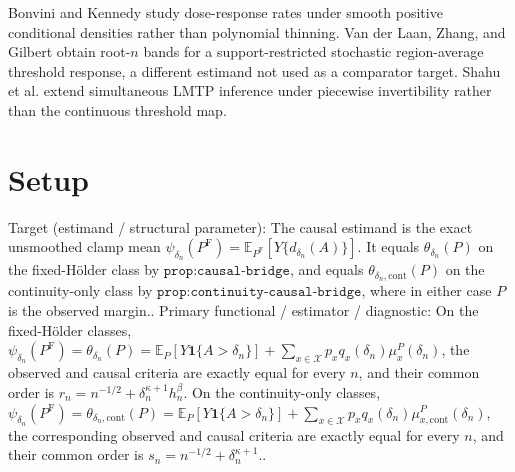 \documentclass{article}
\begin{document}
Bonvini and Kennedy study dose-response rates under smooth positive conditional densities rather than polynomial thinning. Van der Laan, Zhang, and Gilbert obtain root-\(n\) bands for a support-restricted stochastic region-average threshold response, a different estimand not used as a comparator target. Shahu et al. extend simultaneous LMTP inference under piecewise invertibility rather than the continuous threshold map.

\section{Setup}

Target (estimand / structural parameter): The causal estimand is the exact unsmoothed clamp mean \(\psi_{\delta_n}(P^{\mathrm F})=\mathbb E_{P^{\mathrm F}}[Y\{d_{\delta_n}(A)\}]\).  It equals \(\theta_{\delta_n}(P)\) on the fixed-Hölder class by \(\texttt{prop:causal-bridge}\), and equals \(\theta_{\delta_n,\mathrm{cont}}(P)\) on the continuity-only class by \(\texttt{prop:continuity-causal-bridge}\), where in either case \(P\) is the observed margin..
Primary functional / estimator / diagnostic: On the fixed-Hölder classes, \(\psi_{\delta_n}(P^{\mathrm F})=\theta_{\delta_n}(P)=\mathbb E_P[Y\mathbf 1\{A>\delta_n\}]+\sum_{x\in\mathcal X}p_xq_x(\delta_n)\mu_x^P(\delta_n)\), the observed and causal criteria are exactly equal for every \(n\), and their common order is \(r_n=n^{-1/2}+\delta_n^{\kappa+1}h_n^\beta\).  On the continuity-only classes, \(\psi_{\delta_n}(P^{\mathrm F})=\theta_{\delta_n,\mathrm{cont}}(P)=\mathbb E_P[Y\mathbf 1\{A>\delta_n\}]+\sum_{x\in\mathcal X}p_xq_x(\delta_n)\mu_{x,\mathrm{cont}}^P(\delta_n)\), the corresponding observed and causal criteria are exactly equal for every \(n\), and their common order is \(s_n=n^{-1/2}+\delta_n^{\kappa+1}\)..
\end{document}
